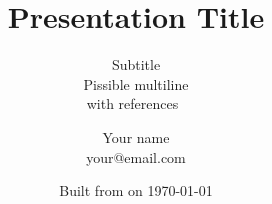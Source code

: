 \title{Presentation Title}

\subtitle{
	Subtitle \\
	{\small Pissible multiline} \\
	with references~\cite{path-oram}
}

\date{Built from \href{https://git.dbogatov.org/templates/latex-presentation/commit/\version}{\emph{\version}} on \today}

\author{Your name \\ your@email.com}


\def\wm{\begin{tabular}{c} Optional \\ Watermark \end{tabular}}
